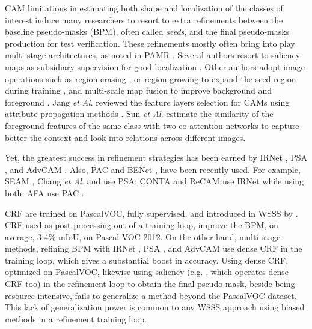 \documentclass[runningheads]{styles/llncs}
\begin{document}
CAM limitations in estimating both shape and localization of the classes of interest \cite{chen2022class,guo2019visual,Bae2020,wang2020self} induce many researchers to resort to extra refinements between the baseline pseudo-masks (BPM), often called  {\em seeds}, and the final pseudo-masks production for test verification. These refinements mostly often bring into play multi-stage architectures, as noted in PAMR \cite{araslanov2020single}. 
Several authors resort to saliency maps as subsidiary supervision for good localization \cite{wei2016stc,Lee_2021_CVPR,xu2021leveraging,sun2022inferring,zhou2022regional}. Other authors adopt image operations such as region erasing \cite{singh2017hide,wei2017object}, or region growing 
 to expand the
seed region during training \cite{kolesnikov2016seed,huang2018weakly}, and  multi-scale map fusion to improve background and foreground \cite{wei2018revisiting}. 
Jang {\em et Al.} \cite{jiang2019integral} reviewed the  feature layers selection for CAMs using attribute propagation methods \cite{montavon2017explaining}.  Sun  {\em et Al.} \cite{sun2020mining}  estimate the similarity of the foreground features of the same class with two co-attention networks to capture better the context and \cite{Fan2020CIANCA} look into relations across different images. 

Yet, the greatest success in refinement strategies has been earned  by IRNet \cite{ahn2019weakly},  PSA \cite{ahn2018learning},  and AdvCAM \cite{lee2021anti}. Also,  PAC \cite{su2019pixel} and BENet \cite{chen2020weakly}, have been recently used. For example, SEAM \cite{wang2020self}, Chang  
{\em et Al.} \cite{chang2020weakly} and \cite{shimoda2019self} use PSA;  CONTA \cite{dong_2020_conta} and ReCAM \cite{chen2022class} use IRNet while \cite{lee2021anti} using both.  AFA \cite{ru2022learning} use PAC \cite{su2019pixel}. 

CRF\cite{krahenbuhl2011efficient} are trained on PascalVOC, fully supervised, and introduced in WSSS by \cite{kolesnikov2016seed}. CRF used as post-processing out of a training loop, improve the BPM, on average, 3-4\% mIoU, on Pascal VOC 2012. On the other hand, multi-stage methods, refining BPM with IRNet \cite{ahn2019weakly},  PSA \cite{ahn2018learning},  and AdvCAM \cite{lee2021anti} use dense CRF in the training loop, which gives a substantial boost in accuracy.   Using dense CRF, optimized on PascalVOC, likewise using saliency (e.g. \cite{hou2017deeply}, which operates dense CRF too)   in the refinement loop to obtain the final pseudo-mask, beside being resource intensive,  fails to generalize a method beyond the PascalVOC dataset. This lack of generalization power is common to any  WSSS approach using biased methods in a refinement training loop. 
\end{document}
